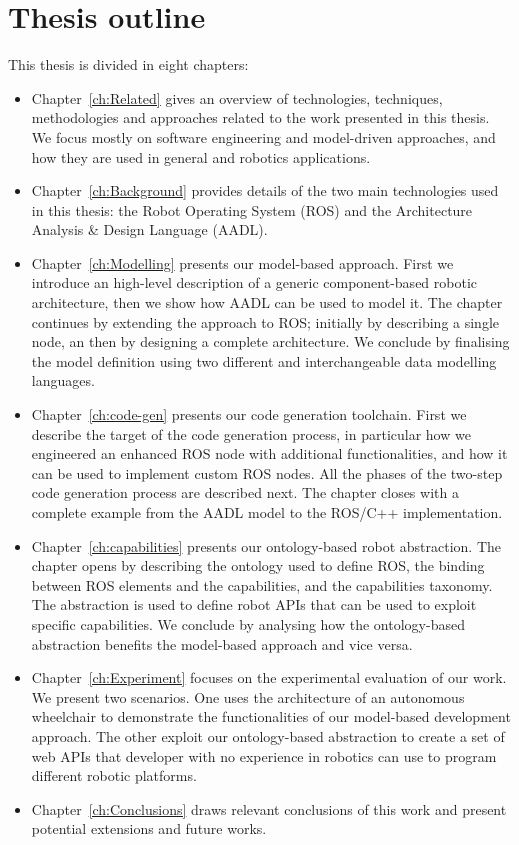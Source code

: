 \section{Thesis outline}
This thesis is divided in eight chapters:
\begin{itemize}
\item Chapter~\ref{ch:Related} gives an overview of technologies, techniques, methodologies and approaches related to the work presented in this thesis.  We focus mostly on software engineering and model-driven approaches, and how they are used in general and robotics applications.
\item Chapter~\ref{ch:Background} provides details of the two main technologies used in this thesis: the Robot Operating System (ROS) and the Architecture Analysis \& Design Language (AADL).
\item Chapter~\ref{ch:Modelling} presents our model-based approach. First we introduce an high-level description of a generic component-based robotic architecture, then we show how AADL can be used to model it. The chapter continues by extending the approach to ROS; initially by describing a single node, an then by designing a complete architecture. We conclude by finalising the model definition using two different and interchangeable data modelling languages.
\item Chapter~\ref{ch:code-gen} presents our code generation toolchain. First we describe the target of the code generation process, in particular how we engineered an enhanced ROS node with additional functionalities, and how it can be used to implement custom ROS nodes. All the phases of the two-step code generation process are described next. The chapter closes with a complete example from the AADL model to the ROS/C++ implementation.
\item Chapter~\ref{ch:capabilities} presents our ontology-based robot abstraction. The chapter opens by describing the ontology used to define ROS, the binding between ROS elements and the capabilities, and the capabilities taxonomy. The abstraction is used to define robot APIs that can be used to exploit specific capabilities. We conclude by analysing how the ontology-based abstraction benefits the model-based approach and vice versa.
\item Chapter~\ref{ch:Experiment} focuses on the experimental evaluation of our work. We present two scenarios. One uses the architecture of an autonomous wheelchair to demonstrate the functionalities of our model-based development approach. The other exploit our ontology-based abstraction to create a set of web APIs that developer with no experience in robotics can use to program different robotic platforms.
\item Chapter~\ref{ch:Conclusions} draws relevant conclusions of this work and present potential extensions and future works.
\end{itemize}


